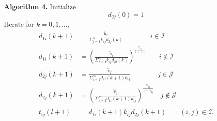 \documentclass[twocolumn]{article}
\begin{document}

 {\bf Algorithm 4.}
 Initialize
 \[
  d_{2j}(0) = 1
\]
 Iterate for $k= 0,1, \dots$, 
 \begin{equation}
\begin{aligned}
 d_{1i}(k+1)  &=  \frac{\tilde{u}_i}{\Sigma_{j=1}^n k_{ij}d_{2j}(k)}\qquad \qquad i \in \mathcal{I}			
	\\
 d_{1i}(k+1) &= \left(\frac{\tilde{u}_i}{\Sigma_{i=1}^n k_{ij}d_{2i}(k)}\right)^\frac{\gamma_{1i}}{1+\gamma_{1i}}
\qquad i \notin \mathcal{I}
	\\
	d_{2j}(k+1) &= \frac{\tilde{v}_j}{\Sigma_{i=1}^m d_{1i}(k+1)k_{ij}}	\qquad \qquad j \in \mathcal{J}	\\
d_{2j}(k+1) &= \left(\frac{\tilde{v}_j}{\Sigma_{i=1}^m d_{1i}(k+1)k_{ij}}\right)^\frac{\gamma_{2j}}{1+\gamma_{2j}}
 \quad	j \notin \mathcal{J}\\
\\
 t_{ij}(l+1) &= d_{1i}(k+1)k_{ij}d_{2j}(k+1)\qquad (i,j) \in \mathcal{Z}
 \end{aligned}
 \end{equation}






\end{document}
